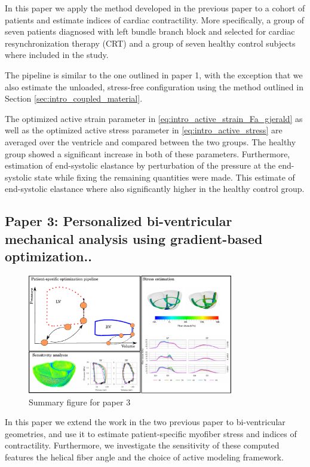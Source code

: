 In this paper we apply the method developed in the previous paper to a
cohort of patients and estimate indices of cardiac contractility. More
specifically, a group of seven patients diagnosed with left bundle branch block and
selected for cardiac resynchronization therapy (CRT) and a group of
seven healthy control subjects where included in the study.

The pipeline is similar to the one outlined in paper 1, with the
exception that we also estimate the unloaded, stress-free
configuration using the method outlined in Section
\ref{sec:intro_coupled_material}. 

The optimized active strain parameter in
\eqref{eq:intro_active_strain_Fa_gjerald} as well as the optimized
active stress parameter in \eqref{eq:intro_active_stress} are averaged
over the ventricle and compared between the two groups. The healthy
group showed a significant increase in both of these
parameters. Furthermore, estimation of end-systolic elastance by
perturbation of the pressure at the end-systolic state while fixing
the remaining quantities were made. This estimate of end-systolic
elastance where also significantly higher in the healthy control
group. 


\subsection{Paper 3: Personalized bi-ventricular mechanical analysis
  using gradient-based optimization..}

\begin{figure}[htbp]
  \centering
    \includegraphics[width=0.8\textwidth]{chapters/introduction/figures/paper3}
\caption{Summary figure for paper 3}
\label{fig:paper3}
\end{figure}

In this paper we extend the work in the two previous paper to
bi-ventricular geometries, and use it to estimate patient-specific
myofiber stress and indices of contractility. Furthermore, we investigate
the sensitivity of these computed features the helical fiber angle and
the choice of active modeling framework.

